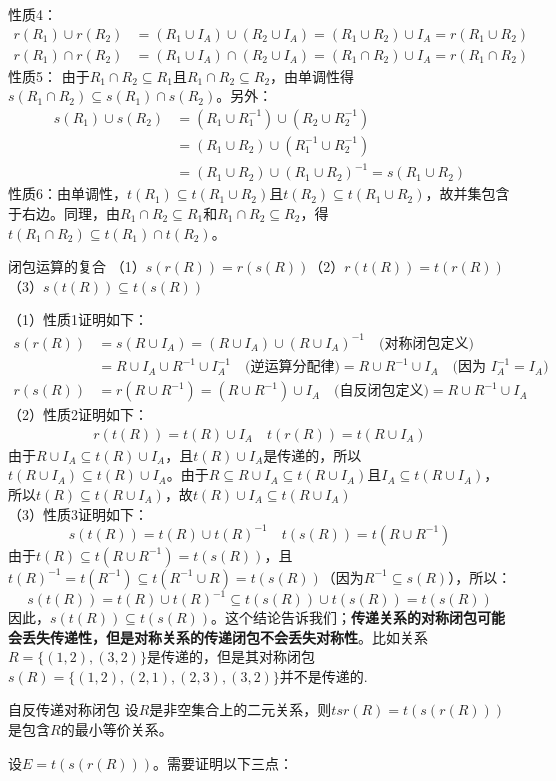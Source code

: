 性质4：\vspace{-20pt}\begin{align*}
r(R_1) \cup r(R_2) &= (R_1 \cup I_A) \cup (R_2 \cup I_A) = (R_1 \cup R_2) \cup I_A = r(R_1 \cup R_2) \\
r(R_1) \cap r(R_2) &= (R_1 \cup I_A) \cap (R_2 \cup I_A) = (R_1 \cap R_2) \cup I_A = r(R_1 \cap R_2)
\end{align*}
性质5：
由于$R_1 \cap R_2 \subseteq R_1$且$R_1 \cap R_2 \subseteq R_2$，由单调性得$s(R_1 \cap R_2) \subseteq s(R_1) \cap s(R_2)$。另外：\vspace{-10pt}
\begin{align*}
s(R_1) \cup s(R_2) &= (R_1 \cup R_1^{-1}) \cup (R_2 \cup R_2^{-1}) \\
&= (R_1 \cup R_2) \cup (R_1^{-1} \cup R_2^{-1}) \\
&= (R_1 \cup R_2) \cup (R_1 \cup R_2)^{-1} = s(R_1 \cup R_2)
\end{align*}
性质6：由单调性，$t(R_1) \subseteq t(R_1 \cup R_2)$且$t(R_2) \subseteq t(R_1 \cup R_2)$，故并集包含于右边。同理，由$R_1 \cap R_2 \subseteq R_1$和$R_1 \cap R_2 \subseteq R_2$，得$t(R_1 \cap R_2) \subseteq t(R_1) \cap t(R_2)$。
\begin{theorem}{闭包运算的复合}{}
（1）$s(r(R)) = r(s(R))$\quad（2）$r(t(R)) = t(r(R))$\quad（3）$s(t(R)) \subseteq t(s(R))$
\end{theorem}
（1）性质1证明如下：
\begin{align*}
s(r(R)) &= s(R \cup I_A) = (R \cup I_A) \cup (R \cup I_A)^{-1} \quad \text{(对称闭包定义)} \\
&= R \cup I_A \cup R^{-1} \cup I_A^{-1} \quad \text{(逆运算分配律)} = R \cup R^{-1} \cup I_A \quad \text{(因为 $I_A^{-1} = I_A$)} \\
r(s(R)) &= r(R \cup R^{-1}) = (R \cup R^{-1}) \cup I_A \quad \text{(自反闭包定义)} = R \cup R^{-1} \cup I_A
\end{align*}
（2）性质2证明如下：
\begin{align*}
r(t(R)) = t(R) \cup I_A \quad 
t(r(R)) = t(R \cup I_A) 
\end{align*}
由于$R \cup I_A \subseteq t(R) \cup I_A$，且$t(R) \cup I_A$是传递的，所以$t(R \cup I_A) \subseteq t(R) \cup I_A$。由于$R \subseteq R \cup I_A \subseteq t(R \cup I_A)$且$I_A \subseteq t(R \cup I_A)$，所以$t(R) \subseteq t(R \cup I_A)$，故$t(R) \cup I_A \subseteq t(R \cup I_A)$\\
（3）性质3证明如下：
\[s(t(R)) = t(R) \cup t(R)^{-1} \quad
t(s(R)) = t(R \cup R^{-1}) \]
由于$t(R) \subseteq t(R \cup R^{-1}) = t(s(R))$，且$t(R)^{-1} = t(R^{-1}) \subseteq t(R^{-1} \cup R) = t(s(R))$（因为$R^{-1} \subseteq s(R)$），所以：
\[
s(t(R)) = t(R) \cup t(R)^{-1} \subseteq t(s(R)) \cup t(s(R)) = t(s(R))
\]
因此，$s(t(R)) \subseteq t(s(R))$。这个结论告诉我们；\textbf{传递关系的对称闭包可能会丢失传递性，但是对称关系的传递闭包不会丢失对称性}。比如关系$R=\{(1,2),(3,2)\}$是传递的，但是其对称闭包$s(R)=\{(1,2),(2,1),(2,3),(3,2)\}$并不是传递的.
\begin{theorem}{自反传递对称闭包}{}
    设$R$是非空集合上的二元关系，则$tsr(R)=t(s(r(R)))$是包含$R$的最小等价关系。
\end{theorem}
设$E = t(s(r(R)))$。需要证明以下三点：

